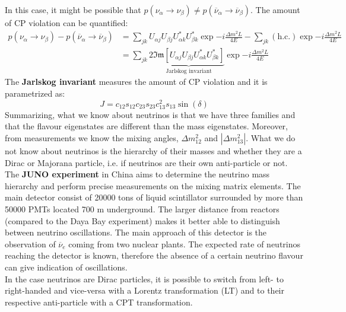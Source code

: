 \documentclass[10.75pt,a4paper,openright,bottom=2cm]{article}
\begin{document}
In this case, it might be possible that $p(\nu_\alpha\to\nu_\beta)\neq p(\overline{\nu}_\alpha\to\overline{\nu}_\beta)$. The amount of CP violation can be quantified:
\begin{align*}
p(\nu_\alpha\to\nu_\beta)-p(\overline{\nu}_\alpha\to\overline{\nu}_\beta)&=\sum_{jk}U_{\alpha j}U_{\beta j}U_{\alpha k}^*U_{\beta k}^*\exp{-i\frac{\Delta m^2L}{4E}}-\sum_{jk}(\text{h.c.})\exp{-i\frac{\Delta m^2L}{4E}}\\
&=\sum_{jk}2\underbrace{\mathfrak{Im}[U_{\alpha j}U_{\beta j}U_{\alpha k}^*U_{\beta k}^*]}_{\text{Jarlskog invariant}}\exp{-i\frac{\Delta m^2L}{4E}}
\end{align*}
The \textbf{Jarlskog invariant} measures the amount of CP violation and it is parametrized as:
\[
J=c_{12}s_{12}c_{23}s_{23}c_{13}^2s_{13}\sin(\delta)
\]
Summarizing, what we know about neutrinos is that we have three families and that the flavour eigenstates are different than the mass eigenstates. Moreover, from measurements we know the mixing angles, $\Delta m^2_{12}$ and $|\Delta m^2_{13}|$. What we do not know about neutrinos is the hierarchy of their masses and whether they are a Dirac or Majorana particle, i.e. if neutrinos are their own anti-particle or not.\\
The \textbf{JUNO experiment} in China aims to determine the neutrino mass hierarchy and perform precise measurements on the mixing matrix elements. The main detector consist of 20000 tons of liquid scintillator surrounded by more than 50000 PMTs located 700 m underground. The larger distance from reactors (compared to the Daya Bay experiment) makes it better able to distinguish between neutrino oscillations. The main approach of this detector is the observation of $\overline{\nu}_e$ coming from two nuclear plants. The expected rate of neutrinos reaching the detector is known, therefore the absence of a certain neutrino flavour can give indication of oscillations.\\
In the case neutrinos are Dirac particles, it is possible to switch from left- to right-handed and vice-versa with a Lorentz transformation (LT) and to their respective anti-particle with a CPT transformation.
\begin{center}
\end{center}
\end{document}
